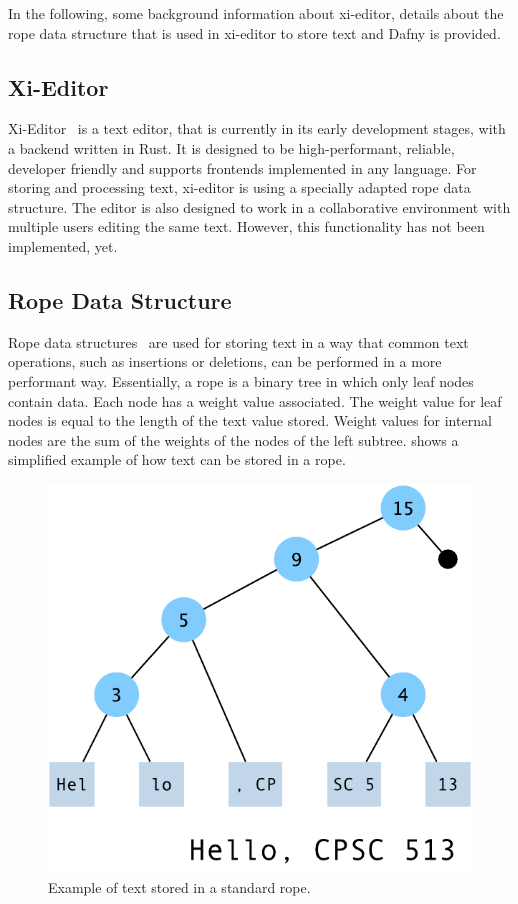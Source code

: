In the following, some background information about xi-editor, details about the rope data structure that is used in xi-editor to store text and Dafny is provided.

\subsection{Xi-Editor}

Xi-Editor~\cite{xi} is a text editor, that is currently in its early development stages, with a backend written in Rust.
It is designed to be high-performant, reliable, developer friendly and supports frontends implemented in any language.
For storing and processing text, xi-editor is using a specially adapted rope data structure.
The editor is also designed to work in a collaborative environment with multiple users editing the same text.
However, this functionality has not been implemented, yet.

\subsection{Rope Data Structure}

Rope data structures~\cite{boehm1995ropes} are used for storing text in a way that common text operations, such as insertions or deletions, can be performed in a more performant way.
Essentially, a rope is a binary tree in which only leaf nodes contain data.
Each node has a weight value associated.
The weight value for leaf nodes is equal to the length of the text value stored.
Weight values for internal nodes are the sum of the weights of the nodes of the left subtree.
 shows a simplified example of how text can be stored in a rope.

\begin{figure}[h]
\centering
\includegraphics[width=0.6\linewidth]{"figures/rope"}
\caption{Example of text stored in a standard rope.}
\label{fig:rope}
\end{figure}

